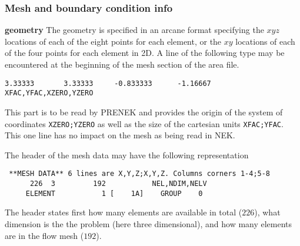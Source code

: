 \subsubsection*{Mesh and boundary condition info} 
\begin{description}
\item{\bf geometry} The geometry is specified in an arcane format specifying
    the \(xyz\) locations of each of the eight points for each element,
    or the \(xy\) locations of each of the four points for each element in 2D.
A line of the following type may be encountered at the beginning of the mesh section of the area file.    
\begin{verbatim}
3.33333       3.33333     -0.833333      -1.16667     XFAC,YFAC,XZERO,YZERO
\end{verbatim}
This part is to be read by PRENEK and provides the origin of the system of coordinates \texttt{XZERO;YZERO} as well as the size of the cartesian units \texttt{XFAC;YFAC}. This one line has no impact on the mesh as being read in NEK. 

The header of the mesh data may have the following representation
\begin{center}
\begin{verbatim} **MESH DATA** 6 lines are X,Y,Z;X,Y,Z. Columns corners 1-4;5-8
      226  3         192           NEL,NDIM,NELV
     ELEMENT           1 [    1A]    GROUP    0
     \end{verbatim}
     \end{center}
The header states first how many elements are available in total (\(226\)), what dimension is the the problem (here three dimensional), and how many elements are in the flow mesh (\(192\)). 



\end{description}
